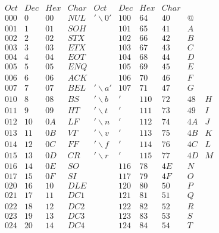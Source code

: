$$ \begin{array}{|lllll||llll|l}
Oct & Dec &  Hex &  Char &          Oct &  Dec &  Hex &  Char \\
\hline
       000 &   0 &     00 &    NUL & '\backslash0' &       100&   64&    40&    @\\
       001&   1&     01&    SOH&     &       101&   65&    41&    A& \\
       002&   2&     02&    STX&     &       102&   66&    42&    B& \\
       003&   3&     03&    ETX&     &       103&   67&    43&    C& \\
       004&   4&     04&    EOT&     &       104&   68&    44&    D& \\
       005&   5&     05&    ENQ&     &       105&   69&    45&    E& \\
       006&   6&     06&    ACK&     &       106&   70&    46&    F& \\
       007&   7&     07&    BEL& '\backslash a'&       107&   71&    47&    G& \\
       010&   8&     08&    BS&  '\backslash b&'&       110&   72&    48&    H \\
       011&   9&     09&    HT&  '\backslash t&'&       111&   73&    49&    I \\
       012&   10&    0A&    LF&  '\backslash n&'&       112&   74&    4A&    J \\
       013&   11&    0B&    VT&  '\backslash v&'&       113&   75&    4B&    K \\
       014&   12&    0C&    FF&  '\backslash f&'&       114&   76&    4C&    L \\
       015&   13&    0D&    CR&  '\backslash r&'&       115&   77&    4D&    M \\
       016&   14&    0E&    SO&     &        116&   78&    4E&    N& \\
       017&   15&    0F&    SI&     &        117&   79&    4F&    O& \\
       020&   16&    10&    DLE&     &       120&   80&    50&    P& \\
       021&   17&    11&    DC1&     &       121&   81&    51&    Q& \\
       022&   18&    12&    DC2&     &       122&   82&    52&    R& \\
       023&   19&    13&    DC3&     &       123&   83&    53&    S& \\
       024&   20&    14&    DC4&     &       124&   84&    54&    T& \\

\end{array}$$
